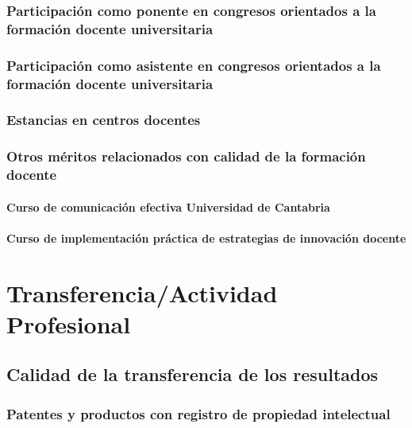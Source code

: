 \documentclass[a4paper, 11pt, twoside, openright]{report}
\begin{document}
\subsection{Participación como ponente en congresos orientados a la formación docente universitaria}

\subsection{Participación como asistente en congresos orientados a la formación docente universitaria}

\subsection{Estancias en centros docentes}

\subsection{Otros méritos relacionados con calidad de la formación docente}

\subsubsection{Curso de comunicación efectiva Universidad de Cantabria}


\subsubsection{Curso de implementación práctica de estrategias de innovación docente}


\chapter{Transferencia/Actividad Profesional}

\section{Calidad de la transferencia de los resultados}

\subsection{Patentes y productos con registro de propiedad intelectual}
\end{document}
